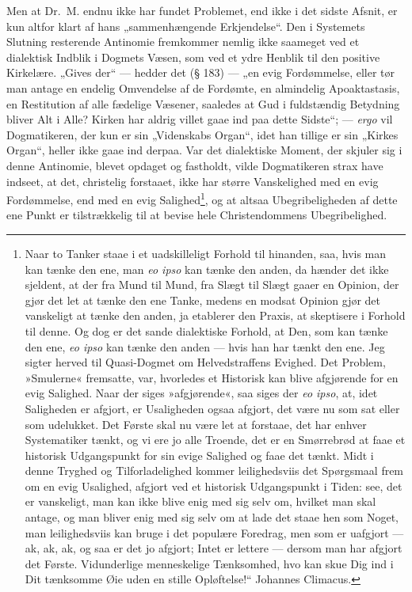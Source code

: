 Men at Dr.\ M. endnu ikke har fundet Problemet, end ikke i det
sidste Afsnit, er kun altfor klart af hans „sammenhængende
Erkjendelse“. Den i Systemets Slutning resterende Antinomie
fremkommer nemlig ikke saameget ved et dialektisk Indblik i
Dogmets Væsen, som ved et ydre Henblik til den positive
Kirkelære. „Gives der“ --- hedder det (§ 183) --- „en evig
Fordømmelse, eller tør man antage en endelig Omvendelse af de
Fordømte, en almindelig Apoaktastasis, en Restitution af alle
fædelige Væsener, saaledes at Gud i fuldstændig Betydning bliver
Alt i Alle? Kirken har aldrig villet gaae ind paa dette Sidste“;
--- \textit{ergo} vil Dogmatikeren, der
 kun er sin „Videnskabs Organ“, idet han tillige er sin „Kirkes
Organ“, heller ikke gaae ind derpaa. Var det dialektiske Moment,
der skjuler sig i denne Antinomie, blevet opdaget og fastholdt,
vilde Dogmatikeren strax have indseet, at det, christelig
forstaaet, ikke har større Vanskelighed med en evig Fordømmelse,
end med en evig Salighed\footnote{Naar to Tanker staae i et
uadskilleligt Forhold til hinanden, saa, hvis man kan tænke den
ene, man \textit{eo ipso} kan tænke den anden, da hænder det ikke
sjeldent, at der fra Mund til Mund, fra Slægt til Slægt gaaer en
Opinion, der gjør det let at tænke den ene Tanke, medens en modsat
Opinion gjør det vanskeligt at tænke den anden, ja etablerer den
Praxis, at skeptisere i Forhold til denne. Og dog er det sande
dialektiske Forhold, at Den, som kan tænke den ene, \textit{eo
ipso} kan tænke den anden --- hvis han har tænkt den ene. Jeg
sigter herved til Quasi-Dogmet om Helvedstraffens Evighed. Det
Problem, »Smulerne« fremsatte, var, hvorledes et Historisk kan
blive afgjørende for en evig Salighed. Naar der siges
»afgjørende«, saa siges der \textit{eo ipso}, at, idet Saligheden
er afgjort, er Usaligheden ogsaa afgjort, det være nu som sat
eller som udelukket. Det Første skal nu være let at forstaae, det
har enhver Systematiker tænkt, og vi ere jo alle Troende, det er
en Smørrebrød at faae et historisk Udgangspunkt for sin evige
Salighed og faae det tænkt. Midt i denne Tryghed og
Tilforladelighed kommer leilighedsviis det Spørgsmaal frem om en
evig Usalighed, afgjort ved et historisk Udgangspunkt i Tiden:
see, det er vanskeligt, man kan ikke blive enig med sig selv om,
hvilket man skal antage, og man bliver enig med sig selv om at
lade det staae hen som Noget, man leilighedsviis
kan bruge i det populære Foredrag, men som er uafgjort --- ak, ak,
ak, og saa er det jo afgjort; Intet er lettere --- dersom man har
afgjort det Første. Vidunderlige menneskelige Tænksomhed, hvo kan
skue Dig ind i Dit tænksomme Øie uden en stille Opløftelse!“
Johannes Climacus.}, og at altsaa Ubegribeligheden af dette ene
Punkt er tilstrækkelig til at bevise hele Christendommens
Ubegribelighed.

